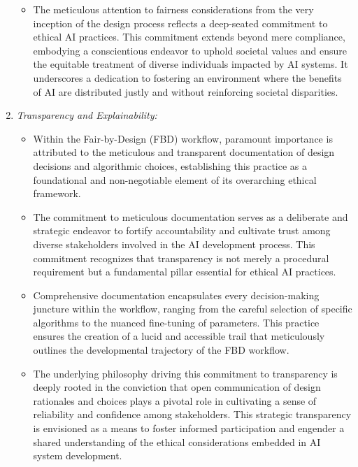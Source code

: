 \begin{enumerate}[label=\arabic*.]
\begin{itemize}
        \item The meticulous attention to fairness considerations from the very inception of the design process reflects a deep-seated commitment to ethical AI practices. This commitment extends beyond mere compliance, embodying a conscientious endeavor to uphold societal values and ensure the equitable treatment of diverse individuals impacted by AI systems. It underscores a dedication to fostering an environment where the benefits of AI are distributed justly and without reinforcing societal disparities.
       
    \end{itemize}

    \item \emph{Transparency and Explainability:}
    
    \begin{itemize}
        
        \item Within the Fair-by-Design (FBD) workflow, paramount importance is attributed to the meticulous and transparent documentation of design decisions and algorithmic choices, establishing this practice as a foundational and non-negotiable element of its overarching ethical framework.
    
        \item The commitment to meticulous documentation serves as a deliberate and strategic endeavor to fortify accountability and cultivate trust among diverse stakeholders involved in the AI development process. This commitment recognizes that transparency is not merely a procedural requirement but a fundamental pillar essential for ethical AI practices.
    
        \item Comprehensive documentation encapsulates every decision-making juncture within the workflow, ranging from the careful selection of specific algorithms to the nuanced fine-tuning of parameters. This practice ensures the creation of a lucid and accessible trail that meticulously outlines the developmental trajectory of the FBD workflow.
    
        \item The underlying philosophy driving this commitment to transparency is deeply rooted in the conviction that open communication of design rationales and choices plays a pivotal role in cultivating a sense of reliability and confidence among stakeholders. This strategic transparency is envisioned as a means to foster informed participation and engender a shared understanding of the ethical considerations embedded in AI system development.
    

\end{itemize}
\end{enumerate}
